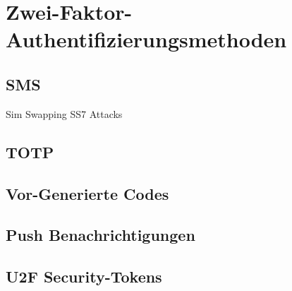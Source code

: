 \chapter{Zwei-Faktor-Authentifizierungsmethoden}
\section{SMS}
Sim Swapping
SS7 Attacks
\section{TOTP}
\section{Vor-Generierte Codes}
\section{Push Benachrichtigungen}
\section{U2F Security-Tokens}
